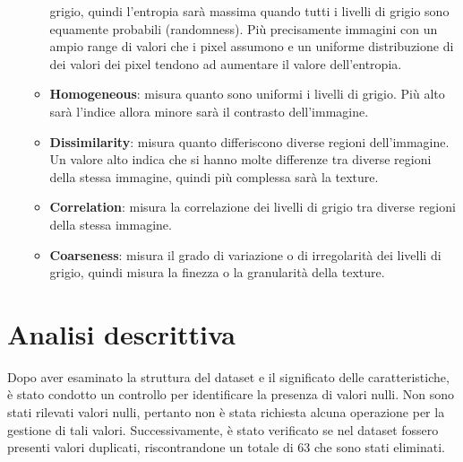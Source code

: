 \begin{enumerate}
\begin{itemize}
                        grigio, quindi l'entropia sarà massima quando tutti i
                        livelli di grigio sono equamente probabili (randomness).
                        Più precisamente immagini con un ampio range di valori
                        che i pixel assumono e un uniforme distribuzione di dei
                        valori dei pixel tendono ad aumentare il valore
                        dell'entropia.
                  \item \textbf{Homogeneous}: misura quanto sono uniformi i
                        livelli di grigio. Più alto sarà l'indice allora minore
                        sarà il contrasto dell'immagine.
                  \item \textbf{Dissimilarity}: misura quanto differiscono
                        diverse regioni dell'immagine. Un valore alto indica che
                        si hanno molte differenze tra diverse regioni della
                        stessa immagine, quindi più complessa sarà la texture.
                  \item \textbf{Correlation}: misura la correlazione dei livelli
                        di grigio tra diverse regioni della stessa immagine.
                  \item \textbf{Coarseness}: misura il grado di variazione o di
                        irregolarità dei livelli di grigio, quindi misura la
                        finezza o la granularità della texture.
            \end{itemize}
\end{enumerate}
\section{Analisi descrittiva}\label{sec:analisi-descrittiva}
Dopo aver esaminato la struttura del dataset e il significato delle
caratteristiche, è stato condotto un controllo per identificare la presenza di
valori nulli. Non sono stati rilevati valori nulli, pertanto non è stata
richiesta alcuna operazione per la gestione di tali valori. Successivamente, è
stato verificato se nel dataset fossero presenti valori duplicati, riscontrandone
un totale di $63$ che sono stati eliminati.

